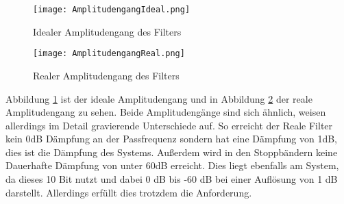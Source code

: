 \begin{figure}[H]
  \centering
    \texttt{[image: AmplitudengangIdeal.png]}
  \caption{Idealer Amplitudengang des Filters}
  \label{fig:AmpBandIdeal}
\end{figure}
\begin{figure}[H]
  \centering
    \texttt{[image: AmplitudengangReal.png]}
  \caption{Realer Amplitudengang des Filters}
  \label{fig:AmpBandReal}
\end{figure}

Abbildung \ref{fig:AmpBandIdeal} ist der ideale Amplitudengang und in Abbildung \ref{fig:AmpBandReal} der reale Amplitudengang zu sehen. 
Beide Amplitudengänge sind sich ähnlich, weisen allerdings im Detail gravierende Unterschiede auf.
So erreicht der Reale Filter kein 0dB Dämpfung an der Passfrequenz sondern hat eine Dämpfung von 1dB, dies ist die Dämpfung des Systems. Außerdem wird in den Stoppbändern keine Dauerhafte Dämpfung von unter 60dB erreicht. Dies liegt ebenfalls am System, da dieses 10 Bit nutzt und dabei
0 dB bis -60 dB bei einer Auflösung von 1 dB darstellt. Allerdings erfüllt dies trotzdem die Anforderung. 

